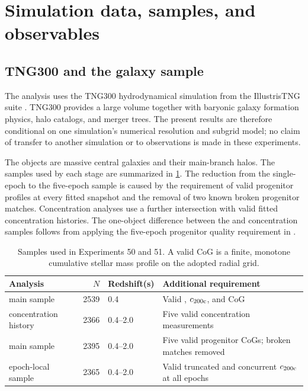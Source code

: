 \section{Simulation data, samples, and observables}
\label{sec:data}

\subsection{TNG300 and the galaxy sample}

The analysis uses the TNG300 hydrodynamical simulation from the IllustrisTNG
suite \citep{Pillepich2018,Nelson2019}. TNG300 provides a large volume together
with baryonic galaxy formation physics, halo catalogs, and merger trees. The
present results are therefore conditional on one simulation's numerical
resolution and subgrid model; no claim of transfer to another simulation or to
observations is made in these experiments.

The objects are massive central galaxies and their main-branch halos. The
samples used by each stage are summarized in \cref{tab:samples}. The reduction
from the single-epoch to the five-epoch sample is caused by the requirement of
valid progenitor profiles at every fitted snapshot and the removal of two known
broken progenitor matches. Concentration analyses use a further intersection
with valid fitted concentration histories. The one-object difference between
the \ExpFifty{} and \ExpFiftyOne{} concentration samples follows from applying
the five-epoch progenitor quality requirement in \ExpFiftyOne{}.

\begin{table}[htbp]
  \centering
  \caption{Samples used in Experiments 50 and 51. A valid CoG is a finite,
  monotone cumulative stellar mass profile on the adopted radial grid.}
  \label{tab:samples}
  \begin{tabularx}{\textwidth}{@{}lrlX@{}}
    \toprule
    Analysis & $N$ & Redshift(s) & Additional requirement \\
    \midrule
    \ExpFifty{} main sample & 2539 & 0.4 & Valid \diffmah{}, $c_{200\mathrm{c}}$, and CoG \\
    \ExpFifty{} concentration history & 2366 & 0.4--2.0 & Five valid concentration measurements \\
    \ExpFiftyOne{} main sample & 2395 & 0.4--2.0 & Five valid progenitor CoGs; broken matches removed \\
    \ExpFiftyOne{} epoch-local sample & 2365 & 0.4--2.0 & Valid truncated \diffmah{} and concurrent $c_{200\mathrm{c}}$ at all epochs \\
    \bottomrule
  \end{tabularx}
\end{table}

